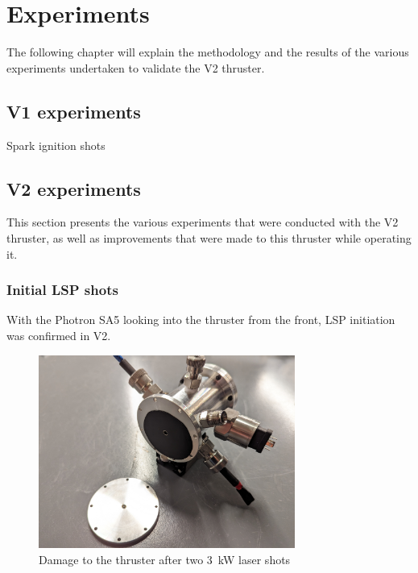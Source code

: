 \chapter{Experiments}

    The following chapter will explain the methodology and the results of the various experiments undertaken to validate the V2 thruster.

    \section{V1 experiments}
        
        Spark ignition shots

    \section{V2 experiments}
        This section presents the various experiments that were conducted with the V2 thruster, as well as improvements that were made to this thruster while operating it.
    
        \subsection{Initial LSP shots}

            With the Photron SA5 looking into the thruster from the front, LSP initiation was confirmed in V2.

            \begin{figure}[!ht]
                \centering
                \includegraphics[width=0.75\textwidth]{assets/4 experiments/V2 test damage.jpg}
                \caption{Damage to the thruster after two \qty{3}{kW} laser shots}
            \end{figure}

